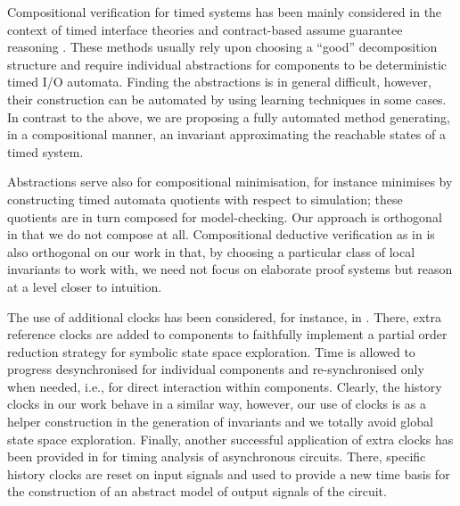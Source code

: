 \documentclass{LMCS}
\theoremstyle{plain}\newtheorem{remark}[thm]{Remark}
\theoremstyle{plain}\newtheorem{example}[thm]{Example}
\begin{document}
Compositional verification for timed systems has been mainly
considered in the context of timed interface theories \cite{Alfaro02}
and contract-based assume guarantee reasoning
\cite{Ecdar,AutomaticCompERAs,mocha}. These methods usually rely upon
choosing a ``good'' decomposition structure and require individual
abstractions for components to be deterministic timed I/O
automata. Finding the abstractions is in general difficult, however,
their construction can be automated by using learning techniques
\cite{AutomaticCompERAs} in some cases. In contrast to the above, we
are proposing a fully automated method generating, in a compositional
manner, an invariant approximating the reachable states of a timed
system.  

Abstractions serve also for compositional minimisation, for instance
\cite{berendsen08} minimises by constructing timed automata quotients
with respect to simulation; these quotients are in turn composed for
model-checking. Our approach is orthogonal in that we do not compose
at all. Compositional deductive verification as in \cite{boer97} is
also orthogonal on our work in that, by choosing a particular class of
local invariants to work with, we need not focus on elaborate proof
systems but reason at a level closer to intuition.

The use of additional clocks has been considered, for instance, in
\cite{Bengtsson98, pettersson07:partial}. There, extra reference
clocks are added to components to faithfully implement a partial order
reduction strategy for symbolic state space exploration. Time is
allowed to progress desynchronised for individual components and
re-synchronised only when needed, i.e., for direct interaction within
components. Clearly, the history clocks in our work behave in a
similar way, however, our use of clocks is as a helper construction in
the generation of invariants and we totally avoid global state space
exploration. Finally, another successful application of extra clocks
has been provided in \cite{SalahBM09} for timing analysis of
asynchronous circuits. There, specific history clocks are reset on
input signals and used to provide a new time basis for the
construction of an abstract model of output signals of the circuit.
\end{document}
